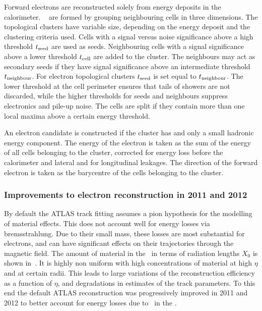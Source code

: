 Forward electrons are reconstructed solely from energy deposits in the calorimeter. 
~\cite{Lampl:1099735} are formed by grouping neighbouring cells in three
dimensions. The topological clusters have variable size, depending
on the energy deposit and the clustering criteria used. Cells with a
signal versus noise significance above a high threshold $t_{\rm{seed}}$ are used as seeds.
Neighbouring cells with a signal significance above a lower threshold
$t_{\rm{cell}}$ are added to the cluster. The neighbours may act as
secondary seeds if they have signal significance above an intermediate threshold
$t_{\rm{neighbour}}$. For electron topological clusters $t_{\rm{seed}}$ is set
equal to $t_{\rm{neighbour}}$. The lower threshold at the cell perimeter ensures that
tails of showers are not discarded, while the higher thresholds for seeds and
neighbours suppress electronics and pile-up noise. The cells are split if they
contain more than one local maxima above a certain energy threshold. 

An electron candidate is constructed if the cluster has  and only a
small hadronic energy component. The energy
of the electron is taken as the sum of the energy of all cells belonging to the cluster,
corrected for energy loss before the calorimeter and lateral and for longitudinal
leakages. The direction of the forward electron is taken as the barycentre of the cells
belonging to the cluster.

\subsubsection{Improvements to electron reconstruction in 2011 and 2012}

By default the ATLAS track fitting assumes a pion hypothesis for the modelling
of material effects. This does not account well for energy losses via
bremsstrahlung. Due to their small mass, these losses are most substantial for
electrons, and can have significant effects on their trajectories through the magnetic
field. The amount of material in the \id\ in terms of radiation lengths
$X_{0}$ is shown in~. It is highly non uniform with high
concentrations of material at high $\eta$ and at certain radii.
This leads to large variations of the reconstruction efficiency as a function of
$\eta$, and degradations in estimates of the track parameters. To this end the
default ATLAS reconstruction was progressively improved in 2011 and 2012 to
better account for energy losses due to \brem\ in the \id.

